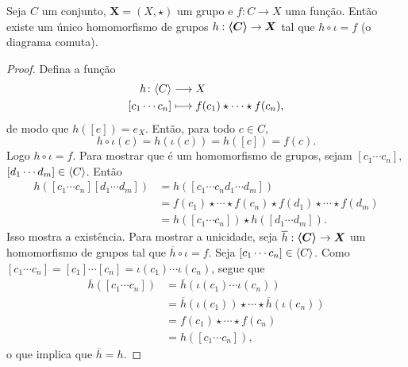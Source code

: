 \begin{proposition}
Seja $C$ um conjunto, $\bm X = (X,\star)$ um grupo e $f: C \to X$ uma função. Então existe um único homomorfismo de grupos $h: \bm{\left\langle C \right\rangle} \to \bm X$ tal que $h \circ \iota = f$ (o diagrama comuta).
\begin{figure}
\centering
{}
\end{figure}
\end{proposition}
\begin{proof}
Defina a função
	\begin{align*}
	{h}\colon {\left\langle C \right\rangle} &\longrightarrow {X} \\{\left[c_1 \cdots c_n\right] } &\longmapsto f(c_1) \star \cdots \star f(c_n),
	\end{align*}
de modo que $h([e])=e_X$. Então, para todo $c \in C$,
	\begin{equation*}
	h \circ \iota(c) = h (\iota(c)) = h([c])=f(c).
	\end{equation*}
Logo $h \circ \iota = f$. Para mostrar que é um homomorfismo de grupos, sejam $[c_1 \cdots c_n],$ $[d_1 \cdots d_m] \in \left\langle C \right\rangle$. Então
	\begin{align*}
	h([c_1 \cdots c_n][d_1 \cdots d_m]) &= h([c_1 \cdots c_nd_1 \cdots d_m]) \\
		&= f(c_1) \star \cdots \star f(c_n) \star f(d_1) \star \cdots  \star f(d_m) \\
		&= h([c_1 \cdots c_n]) \star h([d_1 \cdots d_m]).
	\end{align*}
Isso mostra a existência. Para mostrar a unicidade, seja $\overline h: \bm{\left\langle C \right\rangle} \to \bm X$ um homomorfismo de grupos tal que $\overline h \circ \iota = f$. Seja $[c_1 \cdots c_n] \in \left\langle C \right\rangle$. Como $[c_1 \cdots c_n] = [c_1] \cdots [c_n] = \iota(c_1) \cdots \iota(c_n)$, segue que
	\begin{align*}
	\overline h ([c_1 \cdots c_n]) &= \overline h(\iota(c_1) \cdots \iota(c_n)) \\
		&= \overline h(\iota(c_1)) \star \cdots \star \overline h(\iota(c_n)) \\
		&= f(c_1) \star \cdots \star f(c_n) \\
		&= h([c_1 \cdots c_n]),
	\end{align*}
o que implica que $\overline h = h$.
\end{proof}

